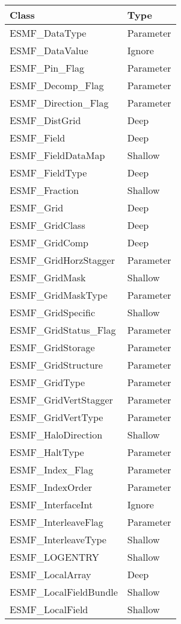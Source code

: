 \begin{table}[t]
\begin{tabular}{ll}

{\bf Class} & {\bf Type} \\ \hline

ESMF\_DataType              & Parameter \\
ESMF\_DataValue             & Ignore\\
ESMF\_Pin\_Flag             & Parameter \\
ESMF\_Decomp\_Flag            & Parameter \\
ESMF\_Direction\_Flag             & Parameter \\
ESMF\_DistGrid              & Deep \\
ESMF\_Field                 & Deep \\
ESMF\_FieldDataMap          & Shallow\\
ESMF\_FieldType             & Deep \\
ESMF\_Fraction              & Shallow\\
ESMF\_Grid                  & Deep \\
ESMF\_GridClass             & Deep \\
ESMF\_GridComp              & Deep \\
ESMF\_GridHorzStagger       & Parameter \\
ESMF\_GridMask              & Shallow\\
ESMF\_GridMaskType          & Parameter \\
ESMF\_GridSpecific          & Shallow\\
ESMF\_GridStatus\_Flag            & Parameter \\
ESMF\_GridStorage           & Parameter \\
ESMF\_GridStructure         & Parameter \\
ESMF\_GridType              & Parameter \\
ESMF\_GridVertStagger       & Parameter \\
ESMF\_GridVertType          & Parameter \\
ESMF\_HaloDirection         & Shallow\\
ESMF\_HaltType              & Parameter \\
ESMF\_Index\_Flag             & Parameter \\
ESMF\_IndexOrder            & Parameter \\
ESMF\_InterfaceInt          & Ignore\\
ESMF\_InterleaveFlag        & Parameter \\
ESMF\_InterleaveType        & Shallow\\
ESMF\_LOGENTRY              & Shallow\\
ESMF\_LocalArray            & Deep \\
ESMF\_LocalFieldBundle           & Shallow\\
ESMF\_LocalField            & Shallow\\

\end{tabular}
\end{table}

